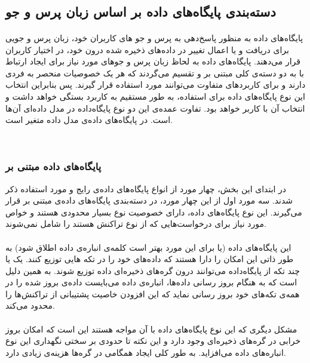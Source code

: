 ‌‌‌\subsection{دسته‌بندی پایگاه‌های داده بر اساس زبان پرس و جو} \label{subsection:databases-by-language}
\paragraph*{}
پایگاه‌های داده به منظور پاسخ‌دهی به پرس و جو
های
کاربران خود، زبان پرس و جویی برای دریافت و یا اعمال تغییر در داده‌های ذخیره شده درون خود، در اختیار کاربران قرار می‌دهند. پایگاه‌های داده به لحاظ زبان پرس و جوهای مورد نیاز برای ایجاد ارتباط با به دو دسته‌ی کلی مبتنی بر
و
تقسیم می‌گردند که هر یک خصوصیات منحصر به فردی دارند و برای کاربردهای متفاوت می‌توانند مورد استفاده قرار گیرند. پس بنابراین انتخاب این نوع پایگاه‌های داده برای استفاده، به طور مستقیم به کاربرد بستگی خواهد داشت و انتخاب آن با کاربر خواهد بود. تفاوت عمده‌ی این دو نوع پایگاه‌داده در مدل داده‌ای
آن‌ها است. در پایگاه‌های داده‌ی
مدل داده متغیر است.
\cite{cattell-2011}

‌‌‌\subsubsection*{پایگاه‌های داده مبتنی بر
}
در ابتدای این بخش، چهار مورد از انواع پایگاه‌های داده‌ی رایج و مورد استفاده ذکر شدند. سه مورد اول از این چهار مورد، در دسته‌بندی پایگاه‌های داده‌ی مبتنی بر
قرار می‌گیرند. این نوع پایگاه‌های داده، دارای خصوصیت نوع
بسیار محدودی هستند و خواص مورد نیاز برای درخواست‌هایی که از نوع تراکنش هستند را شامل نمی‌شوند.
\cite{cattell-2011}

\paragraph*{}
این پایگاه‌های داده (یا برای این مورد بهتر است کلمه‌ی انباره‌ی داده اطلاق شود) به طور ذاتی این امکان را دارا هستند که داده‌های خود را در تکه
هایی
توزیع کنند. یک یا چند تکه از پایگاه‌داده می‌توانند درون گره‌های ذخیره‌ای داده توزیع شوند. به همین دلیل است که به هنگام بروز رسانی داده‌ها، انباره‌ی داده می‌بایست داده‌ی بروز شده را در همه‌ی تکه‌های خود بروز رسانی نماید که این افزودن خاصیت پشتیبانی از تراکنش‌ها را محدود می‌کند.
\cite{stonebraker-2011}

\paragraph*{}
مشکل دیگری که این نوع پایگاه‌های داده با آن مواجه هستند این است که  امکان بروز خرابی
در گره‌های ذخیره‌ای وجود دارد و این نکته تا حدودی بر سختی نگهداری این نوع انباره‌های داده می‌افزاید. به طور کلی ایجاد همگامی
در گره‌ها هزینه‌ی زیادی دارد.
\cite{cattell-2011}

